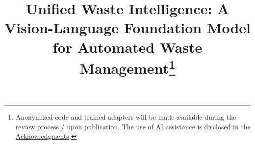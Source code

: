 \documentclass[conference]{IEEEtran}
\begin{document}
\title{Unified Waste Intelligence: A Vision-Language Foundation Model for Automated Waste Management\thanks{Anonymized code and trained adapters will be made available during the review process / upon publication. The use of AI assistance is disclosed in the \hyperref[sec:ack]{Acknowledgments}.}}



\maketitle
\end{document}
